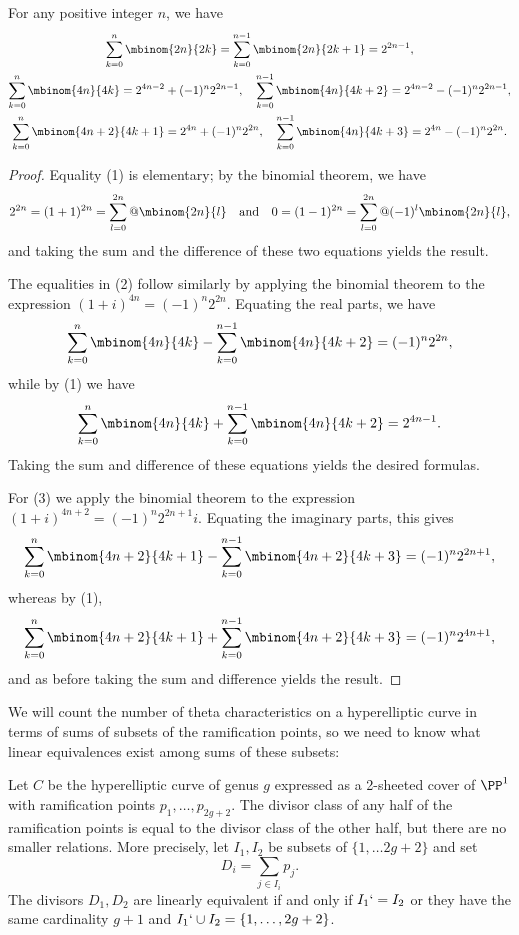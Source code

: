 \begin{lemma}
\label{summing binomials}
For any positive integer $n$,
we have
\let\binom\mbinom
\begin{gather}
\let\;\relax
\sum_{k=0}^n \binom{2n}{2k} \; = \; \sum_{k=0}^{n-1} \binom{2n}{2k+1}
\; = \; 2^{2n-1}
,\\
\sum_{k=0}^n \binom{4n}{4k} = 2^{4n-2}  + (-1)^n 2^{2n-1},
\quad \sum_{k=0}^{n-1} \binom{4n}{4k+2} = 2^{4n-2} - (-1)^n  2^{2n-1}
,\\
\sum_{k=0}^n \binom{4n+2}{4k+1} = 2^{4n} + (-1)^n 2^{2n},
\quad \sum_{k=0}^{n-1} \binom{4n}{4k+3} = 2^{4n} - (-1)^n  2^{2n}
.
\end{gather}
\end{lemma}

\begin{proof}
\let\binom\mbinom
Equality (1) is
elementary; by the binomial theorem, we have
$$
2^{2n} = (1+1)^{2n} = \sum_{l = 0}^{2n}@\binom{2n}{l} \quad \text{and}
\quad 0 = (1-1)^{2n} = \sum_{l = 0}^{2n}@(-1)^l\binom{2n}{l}
,
$$
and taking the sum and the difference of these two equations yields the
result.

The equalities in (2) follow
similarly by applying the binomial theorem to the
expression $(1 + i)^{4n} = (-1)^n2^{2n}$. Equating the real parts, we have
$$
\sum_{k=0}^n \binom{4n}{4k} - \sum_{k=0}^{n-1} \binom{4n}{4k+2} =
(-1)^n2^{2n}
,
$$
while by
(1)
we have
$$
\sum_{k=0}^n \binom{4n}{4k} + \sum_{k=0}^{n-1} \binom{4n}{4k+2} =
2^{4n-1}.
$$
Taking the sum and difference of these equations yields the desired
formulas.

For (3)
we apply the binomial theorem to the expression $(1 + i)^{4n+2} =
 (-1)^n2^{2n+1}i$. Equating the imaginary parts, this gives
\let\;\relax
$$
\sum_{k=0}^n \binom{4n+2}{4k+1} - \sum_{k=0}^{n-1} \binom{4n+2}{4k+3}
\; = \; (-1)^n2^{2n+1}
,
$$
whereas by
(1),
$$
\sum_{k=0}^n \binom{4n+2}{4k+1} + \sum_{k=0}^{n-1} \binom{4n+2}{4k+3}
\; = \; (-1)^n 2^{4n+1}
,
$$
and as before taking the sum and difference
yields the
result.
\end{proof}

We will count the number of theta characteristics on a hyperelliptic
curve in terms of sums of subsets of the ramification points, so we need
to know what linear equivalences exist among sums of these subsets:

\begin{lemma}
\label{ramification point relations}
Let $C$ be the hyperelliptic curve of genus $g$ expressed as a 2-sheeted
cover of $\PP^1$ with ramification points $p_1,\dots,p_{2g+2}$. The
divisor class of
 any half of the ramification points is equal to the divisor class of
 the other half, but there are no
 smaller relations. More precisely,
 let $I_1,I_2$ be subsets of $\{1,\dots 2g+2\}$
and set
$$
D_i = \sum_{j\in I_i} p_j.
$$
The divisors $D_1,D_2$ are linearly equivalent if and only if $I_1 `= I_2$
or they
have the same cardinality $g+1$ and $I_1`\cup I_2 = \{1,\dots, 2g+2\}$.
\end{lemma}

